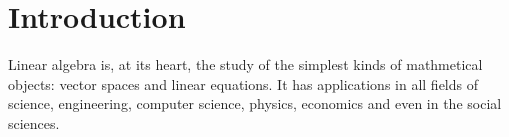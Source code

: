\chapter{Introduction}
\label{Chapter:introduction}

 
  Linear algebra is, at its heart, the study of the simplest kinds of mathmetical objects: vector spaces and linear equations. It has applications in all fields of science, engineering, computer science, physics, economics and even in the social sciences.


